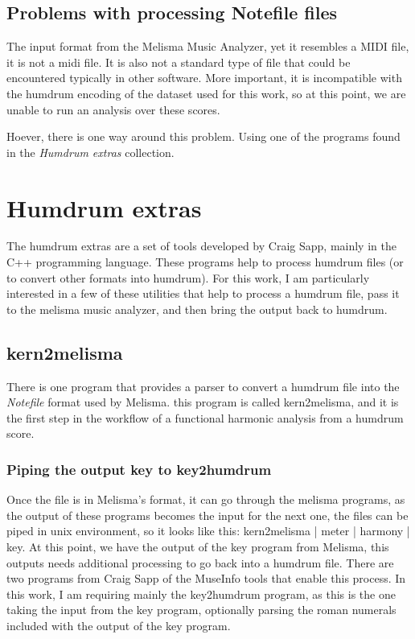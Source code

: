  \subsection{Problems with processing Notefile files}
    The input format from the Melisma Music Analyzer, yet it resembles a MIDI file, it is not a midi file. It is also not a standard type of file that could be encountered typically in other software. More important, it is incompatible with the humdrum encoding of the dataset used for this work, so at this point, we are unable to run an analysis over these scores.

    Hoever, there is one way around this problem. Using one of the programs found in the \emph{Humdrum extras} collection.

\section{Humdrum extras}
  The humdrum extras are a set of tools developed by Craig Sapp, mainly in the C++ programming language. These programs help to process humdrum files (or to convert other formats into humdrum). For this work, I am particularly interested in a few of these utilities that help to process a humdrum file, pass it to the melisma music analyzer, and then bring the output back to humdrum.

  \subsection{kern2melisma}
    There is one program that provides a parser to convert a humdrum file into the \emph{Notefile} format used by Melisma. this program is called kern2melisma, and it is the first step in the workflow of a functional harmonic analysis from a humdrum score.

  \subsubsection{Piping the output key to key2humdrum}
    Once the file is in Melisma's format, it can go through the melisma programs, as the output of these programs becomes the input for the next one, the files can be piped in unix environment, so it looks like this: kern2melisma | meter | harmony | key.
    At this point, we have the output of the key program from Melisma, this outputs needs additional processing to go back into a humdrum file. There are two programs from Craig Sapp of the MuseInfo tools that enable this process. In this work, I am requiring mainly the key2humdrum program, as this is the one taking the input from the key program, optionally parsing the roman numerals included with the output of the key program.

